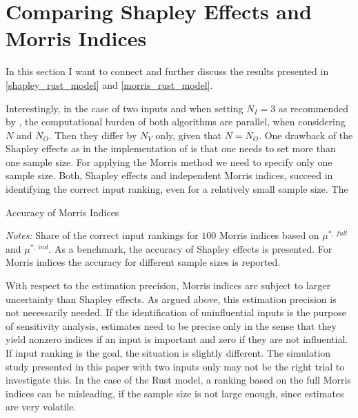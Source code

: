 \section{Comparing Shapley Effects and Morris Indices} \label{comparison}

In this section I want to connect and further discuss the results presented in \cref{shapley_rust_model}
and \cref{morris_rust_model}.

Interestingly, in the case of two inputs and when setting $N_I = 3$ as recommended
by \citet{SNS16}, the computational burden of both algorithms are parallel, when
considering $N$ and $N_O$. Then they differ by $N_V$ only, given that $N = N_O$. One drawback
of the Shapley effects as in the implementation of \citet{SNS16} is that one needs to
set more than one sample size. For applying the Morris method we need to specify only one sample size.
Both, Shapley effects and independent Morris indices, succeed in identifying the correct input
ranking, even for a relatively small sample size. The

\begin{table}
	\centering
	\caption{Accuracy of Morris Indices}
	\label{accuracy}
	\begin{threeparttable}
	\centering
	
	\begin{tablenotes}
	\small
	\item \textit{Notes:} Share of the correct input rankings for $100$ Morris indices based on $\mu^{\ast,\ full}$ and $\mu^{\ast,\ ind}$. As a benchmark, the accuracy of Shapley effects is presented. For Morris indices the accuracy for different sample sizes is reported.
	\end{tablenotes}
	\end{threeparttable}
\end{table}

With respect to the estimation precision, Morris indices are subject to larger uncertainty
than Shapley effects. As argued above, this estimation precision is not necessarily needed. If
the identification of uninfluential inputs is the purpose of sensitivity analysis, estimates need to be precise
only in the sense that they yield nonzero indices if an input is important and zero if they
are not influential. If input ranking is the goal, the situation is slightly different. The simulation
study presented in this paper with two inputs only may not be the right trial to investigate
this. In the case of the Rust model, a ranking based on the full Morris indices can be misleading, if the sample size is not large enough, since estimates are very volatile.

